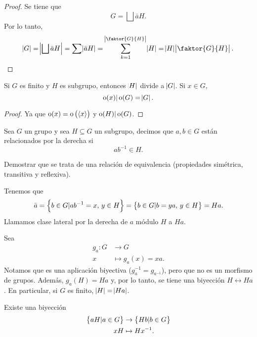 \begin{proof}
    Se tiene que
    \[
        G = \bigsqcup \bar{a}H.
    \]
    Por lo tanto,
    \[
        \abs{G} = \abs{\bigsqcup \bar{a}H} = \sum \abs{\bar{a}H} = \sum^{\abs{\faktor{G}{H}}}_{k = 1} \abs{H} = \abs{H} \abs{\faktor{G}{H}}.
    \]
\end{proof}

\begin{col}
    Si $G$ es finito y $H$ es subgrupo, entonces $\abs{H}$ divide a $\abs{G}$. Si $x \in G$,
    \[
        \operatorname{o}(x) \vert \operatorname{o}(G) = \abs{G}.
    \]
\end{col}

\begin{proof}
    Ya que $\operatorname{o}(x) = \operatorname{o}\left( \left< x \right> \right)$ y $\operatorname{o}(H) \vert \operatorname{o}(G)$.
\end{proof}

\begin{defi}
    Sea $G$ un grupo y sea $H \subseteq G$ un subgrupo, decimos que $a, b \in G$ están relacionados
    por la derecha si
    \[
        ab^{-1} \in H.
    \]
\end{defi}

\begin{ej}
    Demostrar que se trata de una relación de equivalencia (propiedades simétrica, transitiva y reflexiva).
\end{ej}

\begin{defi}
    Tenemos que
    \[
        \bar{a} = \left\{b \in G \vert ab^{-1} = x, \, y \in H\right\} = \left\{b \in G \vert b = ya, \, y \in H\right\} = Ha.
    \]
    Llamamos clase lateral por la derecha de $a$ módulo $H$ a $Ha$.
\end{defi}

\begin{obs}
    Sea
    \[
        \begin{aligned}
            g_a \colon G &\to G \\
            x &\mapsto g_a(x) = xa.
        \end{aligned}
    \]
    Notamos que es una aplicación biyectiva ($g^{-1}_a = g_{a^{-1}}$), pero que no es un morfismo de grupos.
    Además, $g_a(H) = Ha$ y, por lo tanto, se tiene una biyección $H \leftrightarrow Ha$. En particular, si
    $G$ es finito, $\abs{H} = \abs{Ha}$.
\end{obs}

\begin{prop}
    Existe una biyección
    \[
        \begin{aligned}
            \left\{aH \vert a \in G\right\} &\to \left\{Hb \vert b \in G\right\} \\
            xH &\mapsto Hx^{-1}.
        \end{aligned}
    \]
\end{prop}

